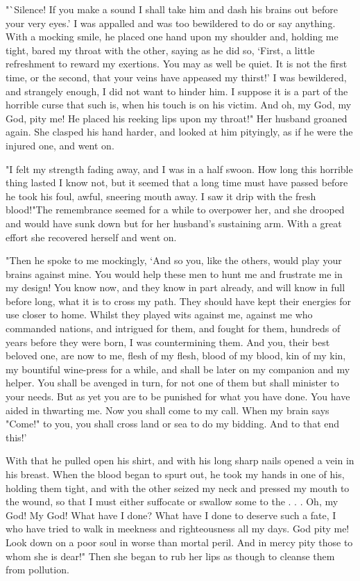 "`Silence! If you make a sound I shall take him and dash his brains out before your very eyes.' I was appalled and was too bewildered to do or say anything. With a mocking smile, he placed one hand upon my shoulder and, holding me tight, bared my throat with the other, saying as he did so, `First, a little refreshment to reward my exertions. You may as well be quiet. It is not the first time, or the second, that your veins have appeased my thirst!' I was bewildered, and strangely enough, I did not want to hinder him. I suppose it is a part of the horrible curse that such is, when his touch is on his victim. And oh, my God, my God, pity me! He placed his reeking lips upon my throat!" Her husband groaned again. She clasped his hand harder, and looked at him pityingly, as if he were the injured one, and went on. 

"I felt my strength fading away, and I was in a half swoon. How long this horrible thing lasted I know not, but it seemed that a long time must have passed before he took his foul, awful, sneering mouth away. I saw it drip with the fresh blood!"The remembrance seemed for a while to overpower her, and she drooped and would have sunk down but for her husband's sustaining arm. With a great effort she recovered herself and went on. 

"Then he spoke to me mockingly, `And so you, like the others, would play your brains against mine. You would help these men to hunt me and frustrate me in my design! You know now, and they know in part already, and will know in full before long, what it is to cross my path. They should have kept their energies for use closer to home. Whilst they played wits against me, against me who commanded nations, and intrigued for them, and fought for them, hundreds of years before they were born, I was countermining them. And you, their best beloved one, are now to me, flesh of my flesh, blood of my blood, kin of my kin, my bountiful wine-press for a while, and shall be later on my companion and my helper. You shall be avenged in turn, for not one of them but shall minister to your needs. But as yet you are to be punished for what you have done. You have aided in thwarting me. Now you shall come to my call. When my brain says "Come!" to you, you shall cross land or sea to do my bidding. And to that end this!' 

With that he pulled open his shirt, and with his long sharp nails opened a vein in his breast. When the blood began to spurt out, he took my hands in one of his, holding them tight, and with the other seized my neck and pressed my mouth to the wound, so that I must either suffocate or swallow some to the . . . Oh, my God! My God! What have I done? What have I done to deserve such a fate, I who have tried to walk in meekness and righteousness all my days. God pity me! Look down on a poor soul in worse than mortal peril. And in mercy pity those to whom she is dear!" Then she began to rub her lips as though to cleanse them from pollution. 

